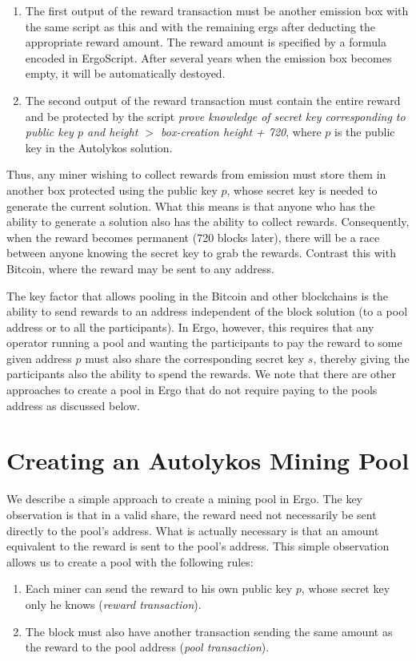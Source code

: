 \documentclass[runningheads]{llncs}
\newcommand{\langname}{ErgoScript\xspace}
\newcommand{\powname}{Autolykos\xspace}
\begin{document}
\begin{enumerate}
	\item The first output of the reward transaction must be another emission box with the same script as this and with the remaining ergs after deducting the appropriate reward amount. The reward amount is specified by a formula encoded in \langname. 
	After several years when the emission box becomes empty, it will be automatically destoyed.
	\item The second output of the reward transaction must contain the entire reward and be protected by the script {\em prove knowledge of secret key corresponding to public key $p$ and height $>$ box-creation height + 720}, where $p$ is the public key in the \powname solution.  
\end{enumerate}

Thus, any miner wishing to collect rewards from emission must store them in another box protected using the public key $p$, whose secret key is needed to generate the current solution. What this means is that anyone who has the ability to generate a solution also has the ability to collect rewards. Consequently, when the reward becomes permanent (720 blocks later), there will be a race between anyone knowing the secret key to grab the rewards. Contrast this with Bitcoin, where the reward may be sent to any address. 

The key factor that allows pooling in the Bitcoin and other blockchains is the ability to send rewards to an address independent of the block solution (to a pool address or to all the participants). In Ergo, however, this requires that any operator running a pool and wanting the participants to pay the reward to some given address $p$ must also share the corresponding secret key $s$, thereby giving the participants also the ability to spend the rewards.
We note that there are other approaches to create a pool in Ergo that do not require paying to the pools address as discussed below.


\section{Creating an \powname Mining Pool}

We describe a simple approach to create a mining pool in Ergo. The key observation is that in a valid share, the reward need not necessarily be sent directly to the pool's address. What is actually necessary is that an amount equivalent to the reward is sent to the pool's address. This simple observation allows us to create a pool with the following rules:
\begin{enumerate}
	\item Each miner can send the reward to his own public key $p$, whose secret key only he knows ({\em reward transaction}).
	\item The block must also have another transaction sending the same amount as the reward to the pool address ({\em pool transaction}).
\end{enumerate}
\end{document}

